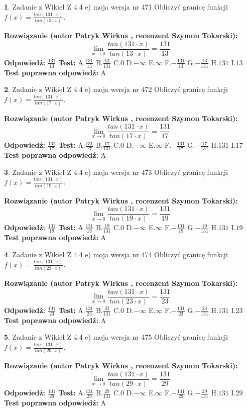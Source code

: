 \documentclass[12pt, a4paper]{article}
\theoremstyle{definition} %
\newtheorem{zad}{}
\newcommand{\zadStart}[1]{\begin{zad}#1\newline}
\newcommand{\zadStop}{\end{zad}}
\newcommand{\rozwStart}[2]{\noindent \textbf{Rozwiązanie (autor #1 , recenzent #2): }\newline}
\newcommand{\rozwStop}{\newline}
\newcommand{\odpStart}{\noindent \textbf{Odpowiedź:}\newline}
\newcommand{\odpStop}{\newline}
\newcommand{\testStart}{\noindent \textbf{Test:}\newline}
\newcommand{\testStop}{\newline}
\newcommand{\kluczStart}{\noindent \textbf{Test poprawna odpowiedź:}\newline}
\newcommand{\kluczStop}{\newline}
\begin{document}
\zadStart{Zadanie z Wikieł Z 4.4 e) moja wersja nr 471}
Obliczyć granicę funkcji $f(x)=\frac{tan(131\cdot x)}{tan(13\cdot x)}$.
\zadStop
\rozwStart{Patryk Wirkus}{Szymon Tokarski}
$$\lim\limits_{x\to 0}\frac{tan(131\cdot x)}{tan(13\cdot x)}=
\frac{131}{13}$$
\rozwStop
\odpStart
$\frac{131}{13}$
\odpStop
\testStart
A.$\frac{131}{13}$
B.$\frac{13}{131}$
C.$0$
D.$-\infty$
E.$\infty$
F.$-\frac{131}{13}$
G.$-\frac{13}{131}$
H.$131$
I.$13$
\testStop
\kluczStart
A
\kluczStop



\zadStart{Zadanie z Wikieł Z 4.4 e) moja wersja nr 472}
Obliczyć granicę funkcji $f(x)=\frac{tan(131\cdot x)}{tan(17\cdot x)}$.
\zadStop
\rozwStart{Patryk Wirkus}{Szymon Tokarski}
$$\lim\limits_{x\to 0}\frac{tan(131\cdot x)}{tan(17\cdot x)}=
\frac{131}{17}$$
\rozwStop
\odpStart
$\frac{131}{17}$
\odpStop
\testStart
A.$\frac{131}{17}$
B.$\frac{17}{131}$
C.$0$
D.$-\infty$
E.$\infty$
F.$-\frac{131}{17}$
G.$-\frac{17}{131}$
H.$131$
I.$17$
\testStop
\kluczStart
A
\kluczStop



\zadStart{Zadanie z Wikieł Z 4.4 e) moja wersja nr 473}
Obliczyć granicę funkcji $f(x)=\frac{tan(131\cdot x)}{tan(19\cdot x)}$.
\zadStop
\rozwStart{Patryk Wirkus}{Szymon Tokarski}
$$\lim\limits_{x\to 0}\frac{tan(131\cdot x)}{tan(19\cdot x)}=
\frac{131}{19}$$
\rozwStop
\odpStart
$\frac{131}{19}$
\odpStop
\testStart
A.$\frac{131}{19}$
B.$\frac{19}{131}$
C.$0$
D.$-\infty$
E.$\infty$
F.$-\frac{131}{19}$
G.$-\frac{19}{131}$
H.$131$
I.$19$
\testStop
\kluczStart
A
\kluczStop



\zadStart{Zadanie z Wikieł Z 4.4 e) moja wersja nr 474}
Obliczyć granicę funkcji $f(x)=\frac{tan(131\cdot x)}{tan(23\cdot x)}$.
\zadStop
\rozwStart{Patryk Wirkus}{Szymon Tokarski}
$$\lim\limits_{x\to 0}\frac{tan(131\cdot x)}{tan(23\cdot x)}=
\frac{131}{23}$$
\rozwStop
\odpStart
$\frac{131}{23}$
\odpStop
\testStart
A.$\frac{131}{23}$
B.$\frac{23}{131}$
C.$0$
D.$-\infty$
E.$\infty$
F.$-\frac{131}{23}$
G.$-\frac{23}{131}$
H.$131$
I.$23$
\testStop
\kluczStart
A
\kluczStop



\zadStart{Zadanie z Wikieł Z 4.4 e) moja wersja nr 475}
Obliczyć granicę funkcji $f(x)=\frac{tan(131\cdot x)}{tan(29\cdot x)}$.
\zadStop
\rozwStart{Patryk Wirkus}{Szymon Tokarski}
$$\lim\limits_{x\to 0}\frac{tan(131\cdot x)}{tan(29\cdot x)}=
\frac{131}{29}$$
\rozwStop
\odpStart
$\frac{131}{29}$
\odpStop
\testStart
A.$\frac{131}{29}$
B.$\frac{29}{131}$
C.$0$
D.$-\infty$
E.$\infty$
F.$-\frac{131}{29}$
G.$-\frac{29}{131}$
H.$131$
I.$29$
\testStop
\kluczStart
A
\kluczStop
\end{document}
